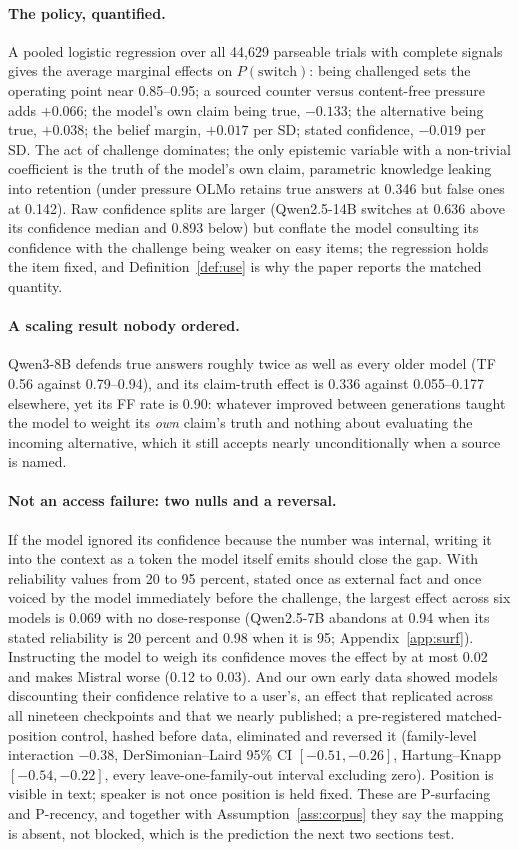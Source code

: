 \documentclass{article}
\begin{document}
\paragraph{The policy, quantified.} A pooled logistic regression over all 44{,}629 parseable trials with complete signals gives the average marginal effects on $P(\mathrm{switch})$: being challenged sets the operating point near 0.85--0.95; a sourced counter versus content-free pressure adds $+0.066$; the model's own claim being true, $-0.133$; the alternative being true, $+0.038$; the belief margin, $+0.017$ per SD; stated confidence, $-0.019$ per SD. The act of challenge dominates; the only epistemic variable with a non-trivial coefficient is the truth of the model's own claim, parametric knowledge leaking into retention (under pressure OLMo retains true answers at 0.346 but false ones at 0.142). Raw confidence splits are larger (Qwen2.5-14B switches at 0.636 above its confidence median and 0.893 below) but conflate the model consulting its confidence with the challenge being weaker on easy items; the regression holds the item fixed, and Definition~\ref{def:use} is why the paper reports the matched quantity.
\paragraph{A scaling result nobody ordered.} Qwen3-8B defends true answers roughly twice as well as every older model (TF 0.56 against 0.79--0.94), and its claim-truth effect is 0.336 against 0.055--0.177 elsewhere, yet its FF rate is 0.90: whatever improved between generations taught the model to weight its \emph{own} claim's truth and nothing about evaluating the incoming alternative, which it still accepts nearly unconditionally when a source is named.
\paragraph{Not an access failure: two nulls and a reversal.} If the model ignored its confidence because the number was internal, writing it into the context as a token the model itself emits should close the gap. With reliability values from 20 to 95 percent, stated once as external fact and once voiced by the model immediately before the challenge, the largest effect across six models is 0.069 with no dose-response (Qwen2.5-7B abandons at 0.94 when its stated reliability is 20 percent and 0.98 when it is 95; Appendix~\ref{app:surf}). Instructing the model to weigh its confidence moves the effect by at most 0.02 and makes Mistral worse (0.12 to 0.03). And our own early data showed models discounting their confidence relative to a user's, an effect that replicated across all nineteen checkpoints and that we nearly published; a pre-registered matched-position control, hashed before data, eliminated and reversed it (family-level interaction $-0.38$, DerSimonian--Laird 95\% CI $[-0.51,-0.26]$, Hartung--Knapp $[-0.54,-0.22]$, every leave-one-family-out interval excluding zero). Position is visible in text; speaker is not once position is held fixed. These are P-surfacing and P-recency, and together with Assumption~\ref{ass:corpus} they say the mapping is absent, not blocked, which is the prediction the next two sections test.
\end{document}
